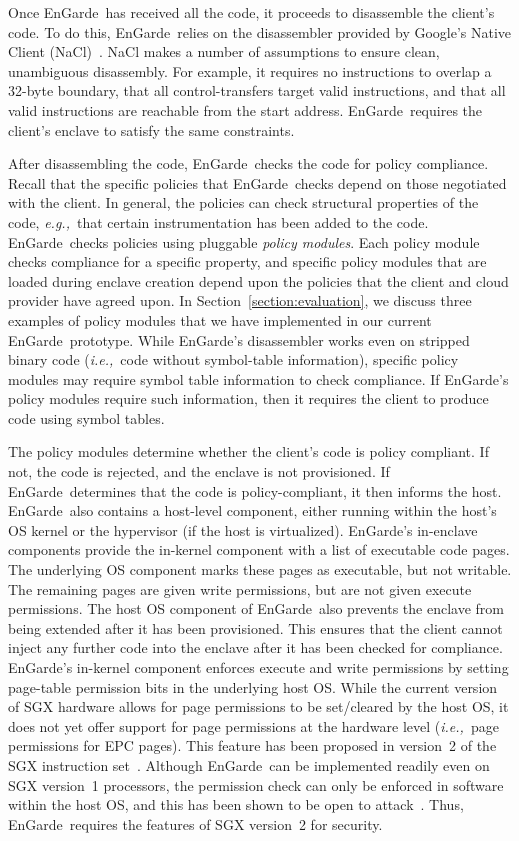 \documentclass[conference,compsoc]{IEEEtran}
\newcommand{\sectref}[1]{Section~\ref{#1}}
\newcommand{\eg}{\textit{e.g.,}\xspace}
\newcommand{\ie}{\textit{i.e.,}\xspace}
\newcommand{\tool}{EnGarde\xspace} %
\begin{document}
Once \tool\ has received all the code, it proceeds to disassemble the client's
code. To do this, \tool\ relies on the disassembler provided by Google's Native
Client (NaCl)~\cite{nativeclient:oak09}. NaCl makes a number of assumptions to
ensure clean, unambiguous disassembly. For example, it requires no instructions
to overlap a 32-byte boundary, that all control-transfers target valid
instructions, and that all valid instructions are reachable from the start
address. \tool\ requires the client's enclave to satisfy the same constraints.

After disassembling the code, \tool\ checks the code for policy compliance.
Recall that the specific policies that \tool\ checks depend on those negotiated
with the client. In general, the policies can check structural properties of
the code, \eg~that certain instrumentation has been added to the code. \tool\
checks policies using pluggable \textit{policy modules}. Each policy module
checks compliance for a specific property, and specific policy modules that are
loaded during enclave creation depend upon the policies that the client and
cloud provider have agreed upon. In \sectref{section:evaluation}, we discuss
three examples of policy modules that we have implemented in our current \tool\
prototype. While \tool's disassembler works even on stripped binary code
(\ie~code without symbol-table information), specific policy modules may
require symbol table information to check compliance. If \tool's policy modules
require such information, then it requires the client to produce code using
symbol tables.

The policy modules determine whether the client's code is policy compliant. If
not, the code is rejected, and the enclave is not provisioned. If \tool\
determines that the code is policy-compliant, it then informs the host. \tool\
also contains a host-level component, either running within the host's OS
kernel or the hypervisor (if the host is virtualized). \tool's in-enclave
components provide the in-kernel component with a list of executable code
pages. The underlying OS component marks these pages as executable, but not
writable. The remaining pages are given write permissions, but are not given
execute permissions. The host OS component of \tool\ also prevents the enclave
from being extended after it has been provisioned. This ensures that the client
cannot inject any further code into the enclave after it has been checked for
compliance. \tool's in-kernel component enforces execute and write permissions
by setting page-table permission bits in the underlying host OS. While the
current version of SGX hardware allows for page permissions to be set/cleared
by the host OS, it does not yet offer support for page permissions at the
hardware level (\ie~page permissions for EPC pages). This feature has been
proposed in version~2 of the SGX instruction set~\cite{sgx:v2:na}. Although
\tool\ can be implemented readily  even on SGX version~1 processors, the
permission check can only be enforced in software within the host OS, and this
has been shown to be open to attack~\cite{asyncshock:esorics16}. Thus, \tool\
requires the features of SGX version~2 for security.
\end{document}
